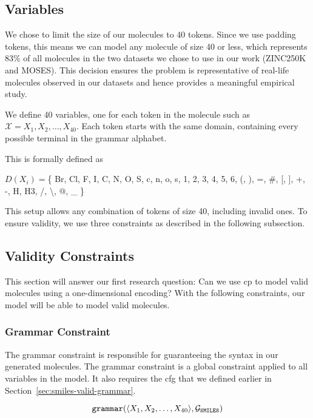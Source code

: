 \documentclass[../Document.tex]{subfiles}
\begin{document}
\subsection{Variables}
We chose to limit the size of our molecules to 40 tokens. Since we use padding tokens, this means we can model any molecule of size 40 or less, which represents 83\% of all molecules in the two datasets we chose to use in our work (ZINC250K and MOSES).
This decision ensures the problem is representative of real-life molecules observed in our datasets and hence provides a meaningful empirical study.

We define 40 variables, one for each token in the molecule such as $\mathcal{X} = {X_1, X_2, \dots, X_{40}}$. Each token starts with the same domain, containing every possible terminal in the \smiles grammar alphabet.

This is formally defined as 
\begin{center}
$D(X_i) = $\{
    Br, Cl, F, I, C, N, O, S, c, n, o, s, 1, 2, 3, 4, 5, 6, (, ), =, \#, [, ], +, -, H, H3, /, \textbackslash, @, \_
\}
\end{center}

This setup allows any combination of \smiles tokens of size 40, including invalid ones. To ensure validity, we use three constraints as described in the following subsection.


\subsection{Validity Constraints}
\label{sec:validity-constraint-definition}
This section will answer our first research question: Can we use \acrshort{cp} to model valid molecules using a one-dimensional encoding?
With the following constraints, our model will be able to model valid \smiles molecules.

\subsubsection{Grammar Constraint}
The grammar constraint is responsible for guaranteeing the \smiles syntax in our generated molecules. The grammar constraint is a global constraint applied to all variables in the model. It also requires the \gls{cfg} that we defined earlier in Section~\ref{sec:smiles-valid-grammar}.

$$
    \texttt{grammar}(\langle X_1, X_2, \ldots, X_{40} \rangle, \mathcal{G}_{\texttt{SMILES}})\\
$$
\end{document}
